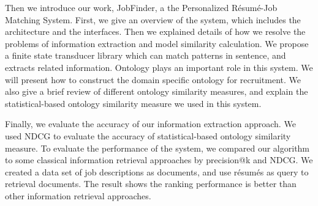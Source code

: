 Then we introduce our work, JobFinder, a the Personalized R\'esum\'e-Job Matching System. First, we give an overview of the system, which includes the architecture and the interfaces. Then we explained details of how we resolve the problems of information extraction and model similarity calculation. We propose a finite state transducer library which can match patterns in sentence, and extracts related information. Ontology plays an important role in this system. We will present how to construct the domain specific ontology for recruitment. We also give a brief review of different ontology similarity measures, and explain the statistical-based ontology similarity measure we used in this system.

Finally, we evaluate the accuracy of our information extraction approach. We used NDCG to evaluate the accuracy of statistical-based ontology similarity measure. To evaluate the performance of the system, we compared our algorithm to some classical information retrieval approaches by precision@k and NDCG. We created a data set of job descriptions as documents, and use r\'esum\'es as query to retrieval documents. The result shows the ranking performance is better than other information retrieval approaches.
